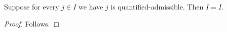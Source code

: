 

\begin{theorem}\label{quantified_missing}
    Suppose for every $j\in I$ we have $j$ is quantified-admissible.
    Then $I=I$.
\end{theorem}
\begin{proof}
    Follows.
\end{proof}
